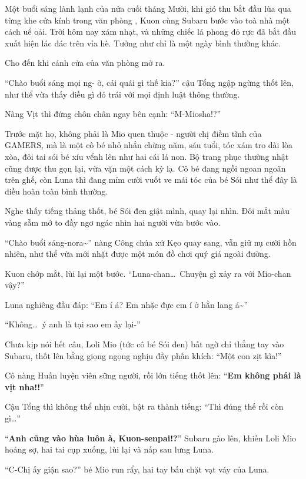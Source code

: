 \documentclass[../main.tex]{subfiles}
\begin{document}
Một buổi sáng lành lạnh của nửa cuối tháng Mười, khi gió thu bắt đầu lùa qua từng khe cửa kính trong văn phòng \hll, Kuon cùng Subaru bước vào toà nhà một cách uể oải. Trời hôm nay xám nhạt, và những chiếc lá phong đỏ rực đã bắt đầu xuất hiện lác đác trên vỉa hè. Tưởng như chỉ là một ngày bình thường khác.

Cho đến khi cánh cửa của văn phòng mở ra.

``Chào buổi sáng mọi ng- ờ, cái quái gì thế kia?'' cậu Tổng ngập ngừng thốt lên, như thể vừa thấy điều gì đó trái với mọi định luật thông thường.

Nàng Vịt thì đứng chôn chân ngay bên cạnh: ``M-Miosha!?''

Trước mặt họ, không phải là Mio quen thuộc - người chị điềm tĩnh của GAMERS, mà là một cô bé nhỏ nhắn chừng năm, sáu tuổi, tóc xám tro dài lòa xòa, đôi tai sói bé xíu vểnh lên như hai cái lá non. Bộ trang phục thường nhật cũng được thu gọn lại, vừa vặn một cách kỳ lạ. Cô bé đang ngồi ngoan ngoãn trên ghế, còn Luna thì đang mỉm cười vuốt ve mái tóc của bé Sói như thể đây là điều hoàn toàn bình thường.


Nghe thấy tiếng thảng thốt, bé Sói đen giật mình, quay lại nhìn. Đôi mắt màu vàng sẫm mở to đầy ngơ ngác nhìn hai người vừa bước vào.

``Chào buổi sáng-nora\~{}'' nàng Công chúa xứ Kẹo quay sang, vẫn giữ nụ cười hồn nhiên, như thể vừa mới nhặt được một món đồ chơi quý giá ngoài đường.

Kuon chớp mắt, lùi lại một bước. ``Luna-chan\dots\ Chuyện gì xảy ra với Mio-chan vậy?''

Luna nghiêng đầu đáp: ``Em í á? Em nhặc đực em í ở hằn lang á\~{}''

``Không\dots\ ý anh là tại sao em ấy lại-''

Chưa kịp nói hết câu, Loli Mio (tức cô bé Sói đen) bất ngờ chỉ thẳng tay vào Subaru, thốt lên bằng giọng ngọng nghịu đầy phấn khích: ``Một con zịt kìa!''

Cô nàng Huấn luyện viên sững người, rồi lớn tiếng thốt lên: ``\textbf{Em không phải là vịt nha!!}''

Cậu Tổng thì không thể nhịn cười, bật ra thành tiếng: ``Thì đúng thế rồi còn gì\dots''

``\textbf{Anh cũng vào hùa luôn à, Kuon-senpai!?}'' Subaru gào lên, khiến Loli Mio hoảng sợ, hai tai cụp xuống, lùi lại và nấp sau lưng Luna.

``C-Chị ấy giận sao?'' bé Mio run rẩy, hai tay bấu chặt vạt váy của Luna.
\end{document}
